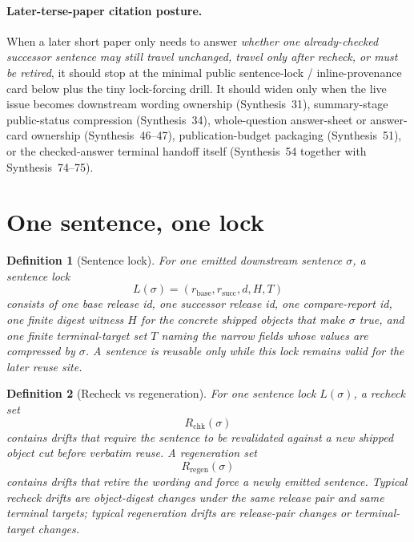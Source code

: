 \documentclass[11pt]{article}
\newtheorem{definition}{Definition}
\begin{document}
\paragraph{Later-terse-paper citation posture.}
When a later short paper only needs to answer \emph{whether one already-checked successor sentence may still travel unchanged, travel only after recheck, or must be retired}, it should stop at the minimal public sentence-lock / inline-provenance card below plus the tiny lock-forcing drill. It should widen only when the live issue becomes downstream wording ownership (Synthesis~31), summary-stage public-status compression (Synthesis~34), whole-question answer-sheet or answer-card ownership (Synthesis~46--47), publication-budget packaging (Synthesis~51), or the checked-answer terminal handoff itself (Synthesis~54 together with Synthesis~74--75).\cite{series:downstreamnormalforms,series:statusenvelopes,series:challengeanswersheets,series:challengeanswercards,series:challengeanswerpublicationprofiles,series:challengeanswerreviewmenus,series:pairedterminalcitationdiscipline,series:pairedterminalcutoverrules}

\section{One sentence, one lock}

\begin{definition}[Sentence lock]
For one emitted downstream sentence $\sigma$, a \emph{sentence lock}
\[
L(\sigma)=(r_{\mathrm{base}},r_{\mathrm{succ}},d,H,T)
\]
consists of one base release id, one successor release id, one compare-report id, one finite digest witness $H$ for the concrete shipped objects that make $\sigma$ true, and one finite terminal-target set $T$ naming the narrow fields whose values are compressed by $\sigma$.
A sentence is reusable only while this lock remains valid for the later reuse site.
\end{definition}

\begin{definition}[Recheck vs regeneration]
For one sentence lock $L(\sigma)$, a \emph{recheck set}
\[
R_{\mathrm{chk}}(\sigma)
\]
contains drifts that require the sentence to be revalidated against a new shipped object cut before verbatim reuse.
A \emph{regeneration set}
\[
R_{\mathrm{regen}}(\sigma)
\]
contains drifts that retire the wording and force a newly emitted sentence.
Typical recheck drifts are object-digest changes under the same release pair and same terminal targets; typical regeneration drifts are release-pair changes or terminal-target changes.
\end{definition}
\end{document}
